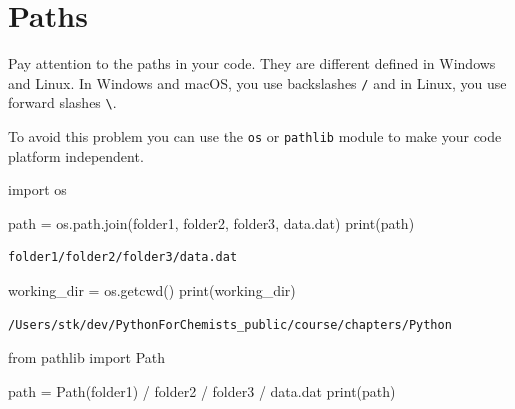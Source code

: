 \documentclass[
  letterpaper,
  DIV=11,
  numbers=noendperiod]{scrreprt}
\newenvironment{Shaded}{\begin{snugshade}}{\end{snugshade}}
\newcommand{\BuiltInTok}[1]{\textcolor[rgb]{0.00,0.23,0.31}{#1}}
\newcommand{\ImportTok}[1]{\textcolor[rgb]{0.00,0.46,0.62}{#1}}
\newcommand{\NormalTok}[1]{\textcolor[rgb]{0.00,0.23,0.31}{#1}}
\newcommand{\OperatorTok}[1]{\textcolor[rgb]{0.37,0.37,0.37}{#1}}
\newcommand{\StringTok}[1]{\textcolor[rgb]{0.13,0.47,0.30}{#1}}
\begin{document}
\chapter*{Paths}\label{paths}


Pay attention to the paths in your code. They are different defined in
Windows and Linux. In Windows and macOS, you use backslashes \texttt{/}
and in Linux, you use forward slashes \texttt{\textbackslash{}}.

To avoid this problem you can use the \texttt{os} or \texttt{pathlib}
module to make your code platform independent.

\begin{Shaded}
\begin{Highlighting}[]
\ImportTok{import}\NormalTok{ os}

\NormalTok{path }\OperatorTok{=}\NormalTok{ os.path.join(}\StringTok{\textquotesingle{}folder1\textquotesingle{}}\NormalTok{, }\StringTok{\textquotesingle{}folder2\textquotesingle{}}\NormalTok{, }\StringTok{\textquotesingle{}folder3\textquotesingle{}}\NormalTok{, }\StringTok{\textquotesingle{}data.dat\textquotesingle{}}\NormalTok{)}
\BuiltInTok{print}\NormalTok{(path)}
\end{Highlighting}
\end{Shaded}

\begin{verbatim}
folder1/folder2/folder3/data.dat
\end{verbatim}

\begin{Shaded}
\begin{Highlighting}[]
\NormalTok{working\_dir }\OperatorTok{=}\NormalTok{ os.getcwd()}
\BuiltInTok{print}\NormalTok{(working\_dir)}
\end{Highlighting}
\end{Shaded}

\begin{verbatim}
/Users/stk/dev/PythonForChemists_public/course/chapters/Python
\end{verbatim}

\begin{Shaded}
\begin{Highlighting}[]
\ImportTok{from}\NormalTok{ pathlib }\ImportTok{import}\NormalTok{ Path}

\NormalTok{path }\OperatorTok{=}\NormalTok{ Path(}\StringTok{\textquotesingle{}folder1\textquotesingle{}}\NormalTok{) }\OperatorTok{/} \StringTok{\textquotesingle{}folder2\textquotesingle{}} \OperatorTok{/} \StringTok{\textquotesingle{}folder3\textquotesingle{}} \OperatorTok{/} \StringTok{\textquotesingle{}data.dat\textquotesingle{}}
\BuiltInTok{print}\NormalTok{(path)}
\end{Highlighting}
\end{Shaded}
\end{document}
